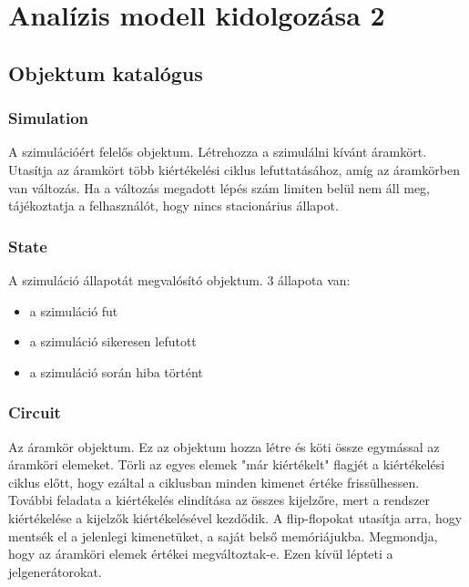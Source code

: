 %
\chapter{Analízis modell kidolgozása 2}

\thispagestyle{fancy}

\section{Objektum katalógus}

\subsection{\bf Simulation}
A szimulációért felelős objektum. Létrehozza a szimulálni kívánt áramkört. Utasítja az áramkört több kiértékelési ciklus lefuttatásához, amíg az áramkörben van változás. Ha a változás megadott lépés szám limiten belül nem áll meg, tájékoztatja a felhasználót, hogy nincs stacionárius állapot.

\subsection{\bf State}
A szimuláció állapotát megvalósító objektum. 3 állapota van:
\begin{itemize}
\item a szimuláció fut \item a szimuláció sikeresen lefutott \item a szimuláció során hiba történt
\end{itemize}

\subsection{\bf Circuit}
Az áramkör objektum. Ez az objektum hozza létre és köti össze egymással az áramköri elemeket. Törli az egyes elemek "már kiértékelt" flagjét a kiértékelési ciklus előtt, hogy ezáltal a ciklusban minden kimenet értéke frissülhessen. További feladata a kiértékelés elindítása az összes kijelzőre, mert a rendszer kiértékelése a kijelzők kiértékelésével kezdődik. A flip-flopokat utasítja arra, hogy mentsék el a jelenlegi kimenetüket, a saját belső memóriájukba. Megmondja, hogy az áramköri elemek értékei megváltoztak-e. Ezen kívül lépteti a jelgenerátorokat.


